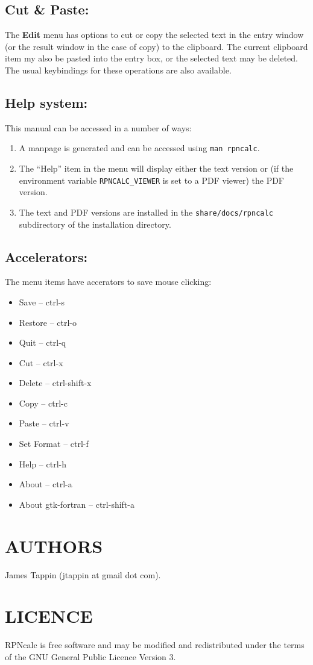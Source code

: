 \documentclass{article}
\begin{document}
\subsection{Cut \& Paste:}

The \textbf{Edit} menu has options to cut or copy the selected text in
the entry window (or the result window in the case of copy) to the
clipboard. The current clipboard item my also be pasted into the entry
box, or the selected text may be deleted. The usual keybindings for
these operations are also available.

\subsection{Help system:}

This manual can be accessed in a number of ways:
\begin{enumerate}
\item A manpage is generated and can be accessed using 
\texttt{man rpncalc}.
\item The ``Help'' item in the menu will display either the text
  version or (if the environment variable \texttt{RPNCALC\_VIEWER} is
  set to a PDF viewer) the PDF version.
\item The text and PDF versions are installed in the
  \texttt{share/docs/rpncalc} subdirectory of the installation directory.
\end{enumerate}

\subsection{Accelerators:}

The menu items have accerators to save mouse clicking:

\begin{itemize}
\item Save -- ctrl-s
\item Restore -- ctrl-o
\item Quit -- ctrl-q
\item Cut -- ctrl-x
\item Delete -- ctrl-shift-x
\item Copy -- ctrl-c
\item Paste -- ctrl-v
\item Set Format -- ctrl-f
\item Help -- ctrl-h
\item About -- ctrl-a
\item About gtk-fortran -- ctrl-shift-a
\end{itemize}

\section{AUTHORS}

James Tappin (jtappin at gmail dot com).

\section{LICENCE}

RPNcalc is free software and may be modified and redistributed under
the terms of the GNU General Public Licence Version 3.

\LatexManEnd
\end{document}
